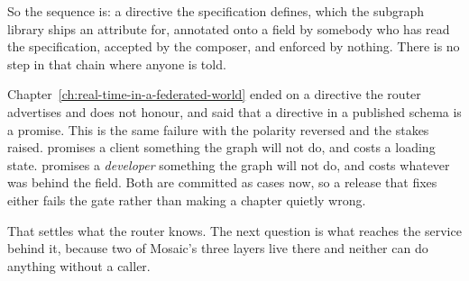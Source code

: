 So the sequence is: a directive the specification defines, which the subgraph
library ships an attribute for, annotated onto a field by somebody who has read
the specification, accepted by the composer, and enforced by nothing. There is
no step in that chain where anyone is told.

Chapter~\ref{ch:real-time-in-a-federated-world} ended on a directive the router
advertises and does not honour, and said that a directive in a published schema
is a promise. This is the same failure with the polarity reversed and the stakes
raised.  promises a client something the graph will not do, and
costs a loading state.  promises a \emph{developer} something the
graph will not do, and costs whatever was behind the field. Both are committed
as cases now, so a release that fixes either fails the gate rather than making a
chapter quietly wrong.

\medskip
That settles what the router knows. The next question is what reaches the
service behind it, because two of Mosaic's three layers live there and neither
can do anything without a caller.

%
